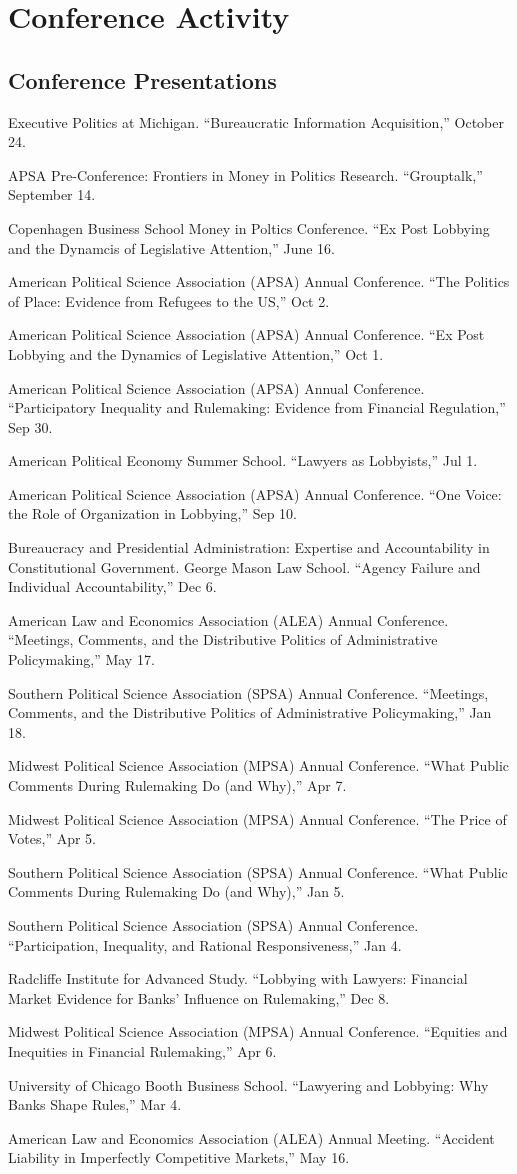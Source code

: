 \documentclass[12pt,letterpaper]{report}
\newcommand{\talk}[4]{\item[#1]{\tab{}#3. \enquote{#2,} #4.}} %
\newcommand{\APSA}{American Political Science Association (APSA) Annual Conference}
\begin{document}
    \section*{Conference Activity}
    
    \subsection*{Conference Presentations}
    \begin{tablist}
	\talk{2022}{Bureaucratic Information Acquisition}{Executive Politics at Michigan}{October 24}
	\talk{2022}{Grouptalk}{APSA Pre-Conference: Frontiers in Money in Politics Research}{September 14}
    \talk{2022}{Ex Post Lobbying and the Dynamcis of Legislative Attention}{Copenhagen Business School Money in Poltics Conference}{June 16}
    \talk{2021}{The Politics of Place: Evidence from Refugees to the US}{\APSA}{Oct 2}
    \talk{2021}{Ex Post Lobbying and the Dynamics of Legislative Attention}{\APSA}{Oct 1}
    \talk{2021}{Participatory Inequality and Rulemaking: Evidence from Financial Regulation}{\APSA}{Sep 30}
    \talk{2021}{Lawyers as Lobbyists}{American Political Economy Summer School}{Jul 1}
    \talk{2020}{One Voice: the Role of Organization in Lobbying}{\APSA}{Sep 10}
    \talk{2019}{Agency Failure and Individual Accountability}{Bureaucracy and Presidential Administration: Expertise and Accountability in Constitutional Government. George Mason Law School}{Dec 6}
    \talk{2019}{Meetings, Comments, and the Distributive Politics of Administrative Policymaking}{American Law and Economics Association (ALEA) Annual Conference}{May 17}
    \talk{2019}{Meetings, Comments, and the Distributive Politics of Administrative Policymaking}{Southern Political Science Association (SPSA) Annual Conference}{Jan 18} 
    \talk{2018}{What Public Comments During Rulemaking Do (and Why)}{Midwest Political Science Association (MPSA) Annual Conference}{Apr 7}
    \talk{2018}{The Price of Votes}{Midwest Political Science Association (MPSA) Annual Conference}{Apr 5}
    \talk{2018}{What Public Comments During Rulemaking Do (and Why)}{Southern Political Science Association (SPSA) Annual Conference}{Jan 5} 
    \talk{2018}{Participation, Inequality, and Rational Responsiveness}{Southern Political Science Association (SPSA) Annual Conference}{Jan 4}    
    \talk{2017}{Lobbying with Lawyers: Financial Market Evidence for Banks’ Influence on Rulemaking}{Radcliffe Institute for Advanced Study}{Dec 8}
    \talk{2017}{Equities and Inequities in Financial Rulemaking}{Midwest Political Science Association (MPSA) Annual Conference}{Apr 6}
	\talk{2017}{Lawyering and Lobbying: Why Banks Shape Rules}{University of Chicago Booth Business School}{Mar 4}
	\talk{2015}{Accident Liability in Imperfectly Competitive Markets}{American Law and Economics Association (ALEA) Annual Meeting}{May 16}
    \end{tablist}
    
\end{document}
